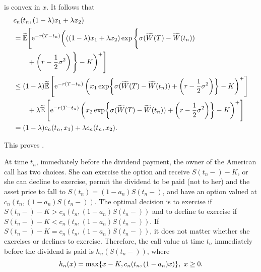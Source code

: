 is convex in \(x\). It follows that
\begin{align}
	 & c_n(t_n, (1 - \lambda)x_1 + \lambda x_2) \nonumber                                                                                                                                                           \\
	 & = \widetilde{\E} \Bigg[ \e^{-r(T-t_n)} \bigg( ((1 - \lambda)x_1 + \lambda x_2) \exp\Bigg\{ \sigma (\widetilde{W}(T) - \widetilde{W}(t_n)) \nonumber                                                          \\
	 & \qquad + \left( r - \frac{1}{2}\sigma^2 \right) \Bigg\} - K \bigg)^+ \Bigg] \nonumber                                                                                                                        \\
	 & \le (1 - \lambda)\widetilde{\E} \left[ \e^{-r(T-t_n)} \left( x_1 \exp \set[\bigg]{ \sigma (\widetilde{W}(T) - \widetilde{W}(t_n)) + \left( r - \frac{1}{2}\sigma^2 \right) } - K \right)^+ \right] \nonumber \\
	 & \qquad + \lambda\widetilde{\E} \left[ \e^{-r(T-t_n)} \left( x_2 \exp \set[\bigg]{ \sigma (\widetilde{W}(T) - \widetilde{W}(t_n)) + \left( r - \frac{1}{2}\sigma^2 \right) } - K \right)^+ \right] \nonumber  \\
	 & = (1 - \lambda)c_n(t_n, x_1) + \lambda c_n(t_n, x_2). \label{eq:ConvexityProof}
\end{align}

This proves .

At time \(t_n\), immediately before the dividend payment, the owner of the American call has two choices. She can exercise the option and receive \(S(t_n-) - K\), or she can decline to exercise, permit the dividend to be paid (not to her) and the asset price to fall to \(S(t_n) = (1 - a_n)S(t_n-)\), and have an option valued at \(c_n(t_n, (1 - a_n)S(t_n-))\). The optimal decision is to exercise if \(S(t_n-) - K > c_n(t_n, (1 - a_n)S(t_n-))\) and to decline to exercise if \(S(t_n-) - K < c_n(t_n, (1 - a_n)S(t_n-))\). If \(S(t_n-) - K = c_n(t_n, (1 - a_n)S(t_n-))\), it does not matter whether she exercises or declines to exercise. Therefore, the call value at time \(t_n\) immediately before the dividend is paid is \(h_n(S(t_n-))\), where
\begin{equation}
	h_n(x) = \max \set{ x - K, c_n(t_n, (1 - a_n)x) }, \ x \ge 0. \label{eq:ValueFunctionHn}
\end{equation}

